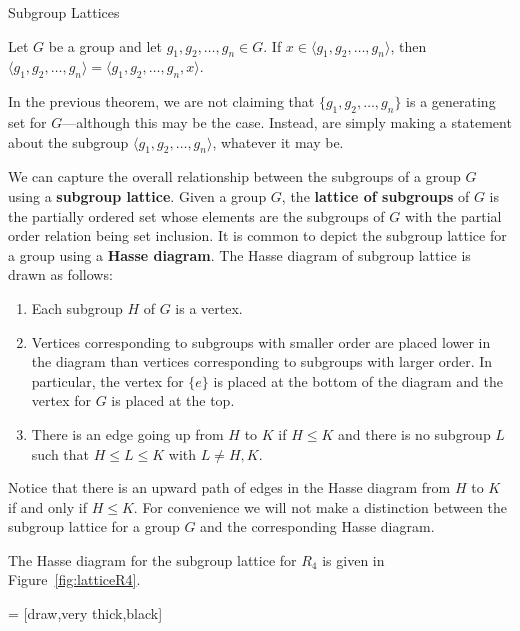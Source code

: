 \begin{section}{Subgroup Lattices}
\begin{theorem}
Let $G$ be a group and let $g_1,g_2,\ldots,g_n\in G$.  If $x\in\langle g_1,g_2,\ldots,g_n\rangle$, then $\langle g_1,g_2,\ldots,g_n\rangle = \langle g_1,g_2,\ldots,g_n,x\rangle$.
\end{theorem}

In the previous theorem, we are not claiming that $\{g_1,g_2,\ldots,g_n\}$ is a generating set for $G$---although this may be the case.  Instead, are simply making a statement about the subgroup $\langle g_1,g_2,\ldots,g_n\rangle$, whatever it may be.

We can capture the overall relationship between the subgroups of a group $G$ using a \textbf{subgroup lattice}.  Given a group $G$, the \textbf{lattice of subgroups} of $G$ is the partially ordered set whose elements are the subgroups of $G$ with the partial order relation being set inclusion. It is common to depict the subgroup lattice for a group using a \textbf{Hasse diagram}.  The Hasse diagram of subgroup lattice is drawn as follows:
\begin{enumerate}[label=\textrm{(\arabic*)}]
\item Each subgroup $H$ of $G$ is a vertex.
\item Vertices corresponding to subgroups with smaller order are placed lower in the diagram than vertices corresponding to subgroups with larger order.  In particular, the vertex for $\{e\}$ is placed at the bottom of the diagram and the vertex for $G$ is placed at the top.
\item There is an edge going up from $H$ to $K$ if $H\leq K$ and there is no subgroup $L$ such that $H\leq L\leq K$ with $L\neq H,K$.
\end{enumerate}
Notice that there is an upward path of edges in the Hasse diagram from $H$ to $K$ if and only if $H\leq K$. For convenience we will not make a distinction between the subgroup lattice for a group $G$ and the corresponding Hasse diagram. 

The Hasse diagram for the subgroup lattice for $R_4$ is given in Figure~\ref{fig:latticeR4}.

 = [draw,very thick,black]

\begin{figure}[!ht]
\centering
{}
\end{figure}
\end{section}
